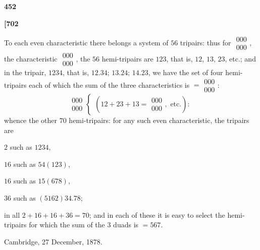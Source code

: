\documentclass[11pt,a4paper]{book}
\begin{document}
\begin{center}
\textbf{452}
\end{center}

\vspace{0.5em}

\noindent\textbf{[702}

\vspace{0.5em}

To each even characteristic there belongs a system of $56$ tripairs: thus for $\begin{matrix} 000 \\ 000 \end{matrix}$, the characteristic $\begin{matrix} 000 \\ 000 \end{matrix}$, the $56$ hemi-tripairs are $123$, that is, $12$, $13$, $23$, etc.; and in the tripair, $1234$, that is, $12.34$; $13.24$; $14.23$, we have the set of four hemi-tripairs each of which the sum of the three characteristics is $= \begin{matrix} 000 \\ 000 \end{matrix}$:
\[
\begin{matrix} 000 \\ 000 \end{matrix}
\begin{cases}
(12 + 23 + 13 = \begin{matrix} 000 \\ 000 \end{matrix}, \text{ etc.}):
\end{cases}
\]
whence the other $70$ hemi-tripairs: for any such even characteristic, the tripairs are

$2$ such as $1234$,

$16$ such as $54(123)$,

$16$ such as $15(678)$,

$36$ such as $(5162)34.78$;

\noindent in all $2 + 16 + 16 + 36 = 70$; and in each of these it is easy to select the hemi-tripairs for which the sum of the $3$ duads is $= 567$.

\vspace{1em}

\begin{flushright}
Cambridge, 27 December, 1878.
\end{flushright}

\vspace{2em}
\end{document}

